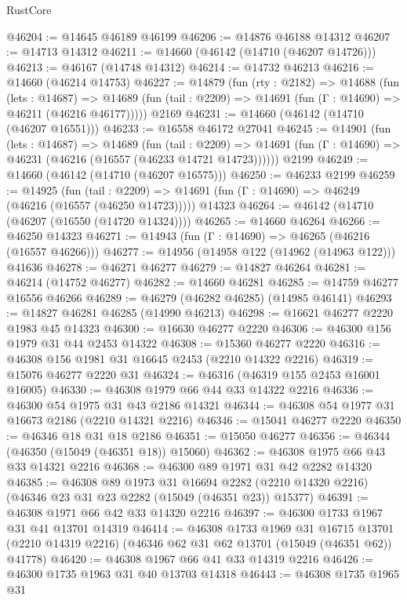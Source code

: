 \begin{lexlean}{RustCore}
\begin{coremodule}
@46204 := @14645 @46189 @46199
@46206 := @14876 @46188 @14312
@46207 := @14713 @14312
@46211 := @14660 (@46142 (@14710 (@46207 @14726)))
@46213 := @46167 (@14748 @14312)
@46214 := @14732 @46213
@46216 := @14660 (@46214 @14753)
@46227 := @14879
    (fun (rty : @2182) =>
    @14688
      (fun (lets : @14687) =>
      @14689 (fun (tail : @2209) => @14691 (fun (Γ : @14690) => @46211 (@46216 @46177)))))
    @2169
@46231 := @14660 (@46142 (@14710 (@46207 @16551)))
@46233 := @16558 @46172 @27041
@46245 := @14901
    (fun (lets : @14687) =>
    @14689
      (fun (tail : @2209) =>
      @14691 (fun (Γ : @14690) => @46231 (@46216 (@16557 (@46233 @14721 @14723))))))
    @2199
@46249 := @14660 (@46142 (@14710 (@46207 @16575)))
@46250 := @46233 @2199
@46259 := @14925
    (fun (tail : @2209) => @14691 (fun (Γ : @14690) => @46249 (@46216 (@16557 (@46250 @14723)))))
    @14323
@46264 := @46142 (@14710 (@46207 (@16550 (@14720 @14324))))
@46265 := @14660 @46264
@46266 := @46250 @14323
@46271 := @14943 (fun (Γ : @14690) => @46265 (@46216 (@16557 @46266)))
@46277 := @14956 (@14958 @122 (@14962 (@14963 @122))) @41636
@46278 := @46271 @46277
@46279 := @14827 @46264
@46281 := @46214 (@14752 @46277)
@46282 := @14660 @46281
@46285 := @14759 @46277 @16556 @46266
@46289 := @46279 (@46282 @46285) (@14985 @46141)
@46293 := @14827 @46281 @46285 (@14990 @46213)
@46298 := @16621 @46277 @2220 @1983 @45 @14323
@46300 := @16630 @46277 @2220
@46306 := @46300 @156 @1979 @31 @44 @2453 @14322
@46308 := @15360 @46277 @2220
@46316 := @46308 @156 @1981 @31 @16645 @2453 (@2210 @14322 @2216)
@46319 := @15076 @46277 @2220 @31
@46324 := @46316 (@46319 @155 @2453 @16001 @16005)
@46330 := @46308 @1979 @66 @44 @33 @14322 @2216
@46336 := @46300 @54 @1975 @31 @43 @2186 @14321
@46344 := @46308 @54 @1977 @31 @16673 @2186 (@2210 @14321 @2216)
@46346 := @15041 @46277 @2220
@46350 := @46346 @18 @31 @18 @2186
@46351 := @15050 @46277
@46356 := @46344 (@46350 (@15049 (@46351 @18)) @15060)
@46362 := @46308 @1975 @66 @43 @33 @14321 @2216
@46368 := @46300 @89 @1971 @31 @42 @2282 @14320
@46385 := @46308
    @89
    @1973
    @31
    @16694
    @2282
    (@2210 @14320 @2216)
    (@46346 @23 @31 @23 @2282 (@15049 (@46351 @23)) @15377)
@46391 := @46308 @1971 @66 @42 @33 @14320 @2216
@46397 := @46300 @1733 @1967 @31 @41 @13701 @14319
@46414 := @46308
    @1733
    @1969
    @31
    @16715
    @13701
    (@2210 @14319 @2216)
    (@46346 @62 @31 @62 @13701 (@15049 (@46351 @62)) @41778)
@46420 := @46308 @1967 @66 @41 @33 @14319 @2216
@46426 := @46300 @1735 @1963 @31 @40 @13703 @14318
@46443 := @46308
    @1735
    @1965
    @31

\end{coremodule}
\end{lexlean}
